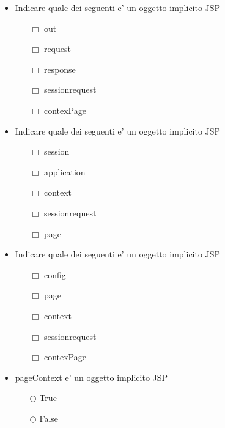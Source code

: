 \documentclass[10pt,twocolumn]{article}
\begin{document}
\begin{itemize}
    \item Indicare quale dei seguenti e' un oggetto implicito JSP
          \begin{itemize}
              \item[$\Box$] out
              \item[$\Box$] request
              \item[$\Box$] response
              \item[$\Box$] sessionrequest
              \item[$\Box$] contexPage
          \end{itemize}
\end{itemize}
\begin{itemize}
    \item Indicare quale dei seguenti e' un oggetto implicito JSP
          \begin{itemize}
              \item[$\Box$] session
              \item[$\Box$] application
              \item[$\Box$] context
              \item[$\Box$] sessionrequest
              \item[$\Box$] page
          \end{itemize}
\end{itemize}
\begin{itemize}
    \item Indicare quale dei seguenti e' un oggetto implicito JSP
          \begin{itemize}
              \item[$\Box$] config
              \item[$\Box$] page
              \item[$\Box$] context
              \item[$\Box$] sessionrequest
              \item[$\Box$] contexPage
          \end{itemize}
\end{itemize}
\begin{itemize}
    \item pageContext e' un oggetto implicito JSP
          \begin{itemize}
              \item[$\bigcirc$] True
              \item[$\bigcirc$] False
          \end{itemize}
\end{itemize}
\end{document}
